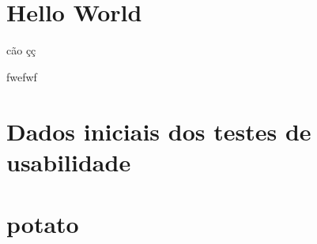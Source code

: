 \documentclass[11pt,twoside,a4paper]{report}
\begin{document}
	\tableofcontents
\chapter{Hello World}
cão çç\par 
fwefwf


\cleardoublepage
\appendix
	
	\chapter{Dados iniciais dos testes de usabilidade}
	\label{apen:usabilidade}
	
	\chapter{potato}
\end{document}
